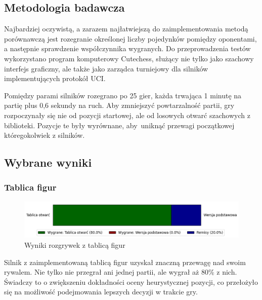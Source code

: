 \subsection{Metodologia badawcza}\label{subsec:metodologia-badawcza}
Najbardziej oczywistą, a zarazem najłatwiejszą do zaimplementowania metodą porównawczą jest rozegranie określonej liczby pojedynków pomiędzy oponentami, a następnie sprawdzenie współczynnika wygranych.
Do przeprowadzenia testów wykorzystano program komputerowy Cutechess, służący nie tylko jako szachowy interfejs graficzny, ale także jako zarządca turniejowy dla silników implementujących protokół UCI.

Pomiędzy parami silników rozegrano po 25 gier, każda trwająca 1 minutę na partię plus 0,6 sekundy na ruch.
Aby zmniejszyć powtarzalność partii, gry rozpoczynały się nie od pozycji startowej, ale od losowych otwarć szachowych z biblioteki. \cite{lichess-book}
Pozycje te były wyrównane, aby~uniknąć przewagi początkowej któregokolwiek z silników.


\subsection{Wybrane wyniki}\label{subsec:wybrane-wyniki}

\subsubsection{Tablica figur}
\begin{figure}[ht]
    \centering
    \includegraphics[width=1\linewidth]{rozdzialy/rozdzial03/1_porownanie-wersji-silnika/rysunki/wyniki-tablica}
    \caption{Wyniki rozgrywek z tablicą figur}
    \label{fig:wyniki-tablica}
\end{figure}
Silnik z zaimplementowaną tablicą figur uzyskał znaczną przewagę nad swoim rywalem.
Nie tylko nie przegrał ani jednej partii, ale wygrał aż 80\% z nich.
Świadczy to o zwiększeniu dokładności oceny heurystycznej pozycji, co przełożyło się na możliwość podejmowania lepszych decyzji w trakcie gry.


